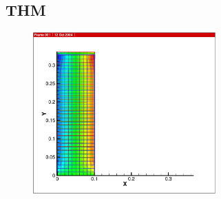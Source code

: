 {\newpage
\subsection{THM}

\begin{figure}[htb!]
  \includegraphics[width=7cm]{figures/thm_quad.eps}\\
\end{figure}

}
